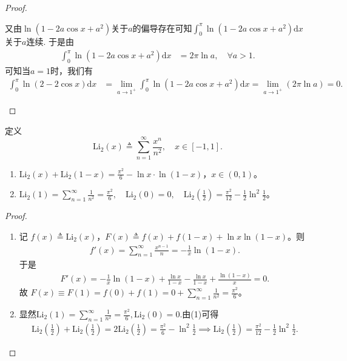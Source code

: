 \documentclass[../../main.tex]{subfiles}
\begin{document}
\begin{proof}
\begin{enumerate}
又由\(\ln(1 - 2a\cos x + a^2)\)关于\(a\)的偏导存在可知\(\int_0^{\pi} \ln(1 - 2a\cos x + a^2) \mathrm{d}x\)关于\(a\)连续. 于是由
\\
\begin{align*}
\int_0^{\pi} \ln(1 - 2a\cos x + a^2) \mathrm{d}x &= 2\pi \ln a, \quad \forall a > 1.
\end{align*}
可知当\(a = 1\)时，我们有
\\
\begin{align*}
\int_0^{\pi} \ln(2 - 2\cos x) \mathrm{d}x &= \lim_{a \to 1^+} \int_0^{\pi} \ln(1 - 2a\cos x + a^2) \mathrm{d}x = \lim_{a \to 1^+} (2\pi \ln a) = 0.
\end{align*} 
\end{enumerate}
\end{proof}

\begin{definition}
定义  
\[
\mathrm{Li}_2(x) \triangleq \sum_{n=1}^{\infty} \frac{x^n}{n^2}, \quad x \in [-1,1].
\] 
\end{definition}

\begin{proposition}\label{proposition:Li_2函数的性质}
\begin{enumerate}[(1)]
\item $\mathrm{Li}_2(x) + \mathrm{Li}_2(1-x) = \frac{\pi^2}{6} - \ln x \cdot \ln(1-x)$，$x \in (0,1)$。  

\item $\mathrm{Li}_2\left( 1 \right) =\sum_{n=1}^{\infty}{\frac{1}{n^2}}=\frac{\pi ^2}{6},\quad \mathrm{Li}_2\left( 0 \right) =0,\quad \mathrm{Li}_2\left(\frac{1}{2}\right) = \frac{\pi^2}{12} - \frac{1}{2} \ln^2 \frac{1}{2}$。
\end{enumerate}
\end{proposition}
\begin{proof}
\begin{enumerate}[(1)]
\item 记 $f(x) \triangleq \mathrm{Li}_2(x)$，$F(x) \triangleq f(x) + f(1-x) + \ln x \ln(1-x)$。则  
\begin{align*}
f'(x) = \sum_{n=1}^{\infty} \frac{x^{n-1}}{n} = -\frac{1}{x} \ln(1-x).
\end{align*}  
于是  
\begin{align*}
F'(x) = -\frac{1}{x} \ln(1-x) + \frac{\ln x}{1-x} - \frac{\ln x}{1-x} + \frac{\ln(1-x)}{x} = 0.
\end{align*}  
故 $F(x) \equiv F(1) = f(0) + f(1) = 0 + \sum_{n=1}^{\infty} \frac{1}{n^2} = \frac{\pi^2}{6}$。  

\item 显然$\mathrm{Li}_2\left( 1 \right) =\sum_{n=1}^{\infty}{\frac{1}{n^2}}=\frac{\pi ^2}{6},\mathrm{Li}_2\left( 0 \right) =0.$由(1)可得  
\begin{align*}
\mathrm{Li}_2\left(\frac{1}{2}\right) + \mathrm{Li}_2\left(\frac{1}{2}\right) = 2\mathrm{Li}_2\left(\frac{1}{2}\right) = \frac{\pi^2}{6} - \ln^2 \frac{1}{2} \implies \mathrm{Li}_2\left(\frac{1}{2}\right) = \frac{\pi^2}{12} - \frac{1}{2} \ln^2 \frac{1}{2}.
\end{align*}  
\end{enumerate}
\end{proof}
\end{document}
